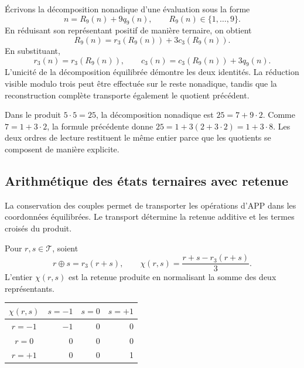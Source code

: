 Écrivons la décomposition nonadique d'une évaluation sous la forme
\[
 n=R_9(n)+9q_9(n),\qquad R_9(n)\in\{1,\ldots,9\}.
\]
En réduisant son représentant positif de manière ternaire, on obtient
\[
 R_9(n)=r_3(R_9(n))+3c_3(R_9(n)).
\]
En substituant,
\begin{equation}
 r_3(n)=r_3(R_9(n)),\qquad
 c_3(n)=c_3(R_9(n))+3q_9(n).
\label{trit:eq:compatibilidad39}
\end{equation}
L'unicité de la décomposition équilibrée démontre les deux identités.
La réduction visible modulo trois peut être effectuée sur le reste
nonadique, tandis que la reconstruction complète transporte également le
quotient précédent.

Dans le produit \(5\cdot5=25\), la décomposition nonadique est
\(25=7+9\cdot2\). Comme \(7=1+3\cdot2\), la formule précédente donne
\(25=1+3(2+3\cdot2)=1+3\cdot8\). Les deux ordres de lecture restituent
le même entier parce que les quotients se composent de manière explicite.

\subsection{Arithmétique des états ternaires avec retenue}
\label{trit:aritmetica}

La conservation des couples permet de transporter les opérations d'APP dans
les coordonnées équilibrées. Le transport détermine la retenue additive et
les termes croisés du produit.

\begin{definicion}
Pour \(r,s\in\mathcal T\), soient
\[
 r\oplus s=r_3(r+s),\qquad
 \chi(r,s)=\frac{r+s-r_3(r+s)}3.
\]
L'entier \(\chi(r,s)\) est la retenue produite en normalisant la somme des
deux représentants.
\end{definicion}

\begin{tablacompleta}
\caption{Retenue additive de la section ternaire équilibrée.}
\begin{tabular}{c|rrr}
\toprule
\(\chi(r,s)\)&\(s=-1\)&\(s=0\)&\(s=+1\)\\
\midrule
\(r=-1\)&$-1$&0&0\\
\(r=0\)&0&0&0\\
\(r=+1\)&0&0&1\\
\bottomrule
\end{tabular}
\end{tablacompleta}

